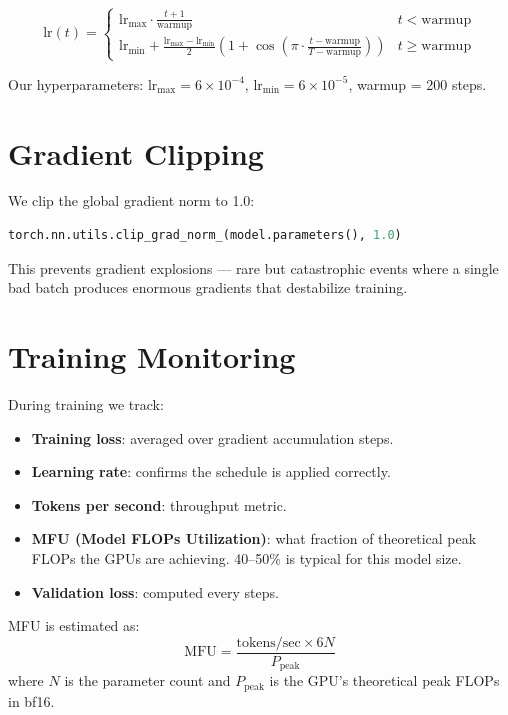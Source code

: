 \[
  \text{lr}(t) = \begin{cases}
    \text{lr}_{\max} \cdot \frac{t+1}{\text{warmup}} & t < \text{warmup} \\[4pt]
    \text{lr}_{\min} + \frac{\text{lr}_{\max} - \text{lr}_{\min}}{2}
      \left(1 + \cos\!\left(\pi \cdot \frac{t - \text{warmup}}{T - \text{warmup}}\right)\right)
    & t \geq \text{warmup}
  \end{cases}
\]

Our hyperparameters: $\text{lr}_{\max} = 6 \times 10^{-4}$, $\text{lr}_{\min} = 6 \times 10^{-5}$, warmup = 200 steps.


\section{Gradient Clipping}

We clip the global gradient norm to 1.0:

\begin{lstlisting}[language=Python]
torch.nn.utils.clip_grad_norm_(model.parameters(), 1.0)
\end{lstlisting}

This prevents gradient explosions --- rare but catastrophic events where a single bad batch produces enormous gradients that destabilize training.


\section{Training Monitoring}

During training we track:
\begin{itemize}
  \item \textbf{Training loss}: averaged over gradient accumulation steps.
  \item \textbf{Learning rate}: confirms the schedule is applied correctly.
  \item \textbf{Tokens per second}: throughput metric.
  \item \textbf{MFU (Model FLOPs Utilization)}: what fraction of theoretical peak FLOPs the GPUs are achieving.  40--50\% is typical for this model size.
  \item \textbf{Validation loss}: computed every  steps.
\end{itemize}

MFU is estimated as:
\[
  \text{MFU} = \frac{\text{tokens/sec} \times 6N}{P_{\text{peak}}}
\]
where $N$ is the parameter count and $P_{\text{peak}}$ is the GPU's theoretical peak FLOPs in bf16.


